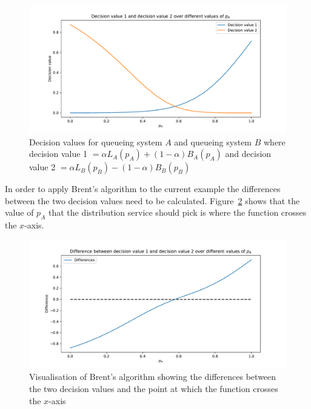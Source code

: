 \begin{figure}[H]
    \centering
    \includegraphics[width=\textwidth]{chapters/04_game_theoretic_model/Bin/brents_method/brent_method_example.pdf}
    \caption{Decision values for queueing system \(A\) and queueing system \(B\)
    where decision value 1 \(= \alpha L_A(p_A) + (1 - \alpha) B_A(p_A)\) and
    decision value 2 \(= \alpha L_B(p_B) - (1 - \alpha) B_B(p_B)\)}
    \label{fig:brent_method_example}
\end{figure}

In order to apply Brent's algorithm to the current example the differences
between the two decision values need to be calculated.
Figure~\ref{fig:brent_method_diffs} shows that the value of \(p_A\) that the
distribution service should pick is where the function crosses the \(x\)-axis.

\begin{figure}[H]
    \centering
    \includegraphics[width=\textwidth]{chapters/04_game_theoretic_model/Bin/brents_method/brent_method_diffs.pdf}
    \caption{Visualisation of Brent's algorithm showing the differences
    between the two decision values and the point at which the function crosses
    the \(x\)-axis}
    \label{fig:brent_method_diffs}
\end{figure}

